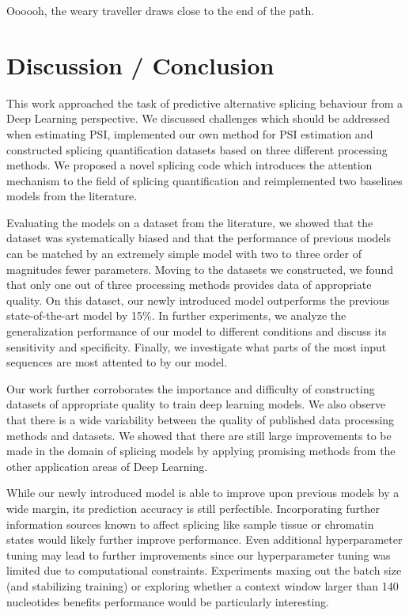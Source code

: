\begin{savequote}[8cm]
	
	Oooooh, the weary traveller draws close to the end of the path.
\end{savequote}

\chapter{\label{ch:6-conclusion}Discussion / Conclusion} %

This work approached the task of predictive alternative splicing behaviour from a Deep Learning perspective.
We discussed challenges which should be addressed when estimating PSI, implemented our own method for PSI estimation and constructed splicing quantification datasets based on three different processing methods. We proposed a novel splicing code which introduces the attention mechanism to the field of splicing quantification and reimplemented two baselines models from the literature.

Evaluating the models on a dataset from the literature, we showed that the dataset was systematically biased and that the performance of previous models can be matched by an extremely simple model with two to three order of magnitudes fewer parameters. 
Moving to the datasets we constructed, we found that only one out of three processing methods provides data of appropriate quality. On this dataset, our newly introduced model outperforms the previous state-of-the-art model by 15\%. In further experiments, we analyze the generalization performance of our model to different conditions and discuss its sensitivity and specificity. Finally, we investigate what parts of the most input sequences are most attented to by our model.

Our work further corroborates the importance and difficulty of constructing datasets of appropriate quality to train deep learning models. We also observe that there is a wide variability between the quality of published data processing methods and datasets. We showed that there are still large improvements to be made in the domain of splicing models by applying promising methods from the other application areas of Deep Learning. %

While our newly introduced model is able to improve upon previous models by a wide margin, its prediction accuracy is still perfectible. Incorporating further information sources known to affect splicing like sample tissue or chromatin states \cite{chromatin} would likely further improve performance. 
Even additional hyperparameter tuning may lead to further improvements since our hyperparameter tuning was limited due to computational constraints. Experiments maxing out the batch size (and stabilizing training) or exploring whether a context window larger than 140 nucleotides benefits performance would be particularly interesting. 

